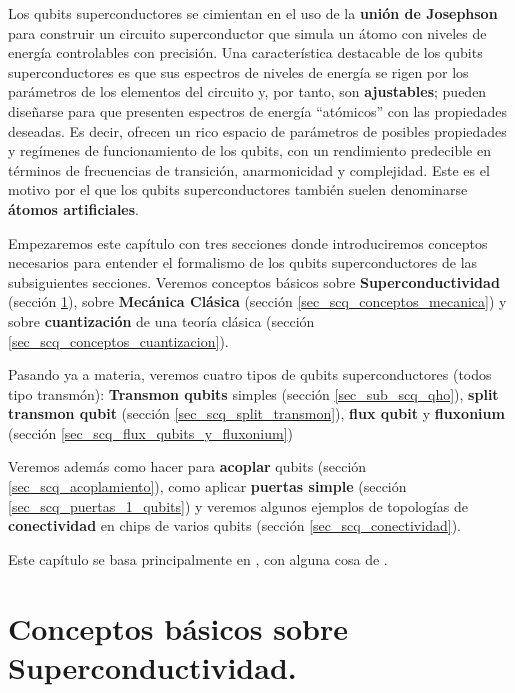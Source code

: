 Los qubits superconductores se cimientan en el uso de la \textbf{unión de Josephson} para construir un circuito superconductor que simula un átomo con niveles de energía controlables con precisión. Una característica destacable de los qubits superconductores es que sus espectros de niveles de energía se rigen por los parámetros de los elementos del circuito y, por tanto, son \textbf{ajustables}; pueden diseñarse para que presenten espectros de energía ``atómicos'' con las propiedades deseadas. Es decir, ofrecen un rico espacio de parámetros de posibles propiedades y regímenes de funcionamiento de los qubits, con un rendimiento predecible en términos de frecuencias de transición, anarmonicidad y complejidad. Este es el motivo por el que los qubits superconductores también suelen denominarse \textbf{átomos artificiales}.

Empezaremos este capítulo con tres secciones donde introduciremos conceptos necesarios para entender el formalismo de los qubits superconductores de las subsiguientes secciones. Veremos conceptos básicos sobre \textbf{Superconductividad} (sección \ref{sec_scq_conceptos_superconductividad}), sobre \textbf{Mecánica Clásica} (sección \ref{sec_scq_conceptos_mecanica}) y sobre \textbf{cuantización} de una teoría clásica (sección \ref{sec_scq_conceptos_cuantizacion}).

Pasando ya a materia, veremos cuatro tipos de qubits superconductores (todos tipo transmón): \textbf{Transmon qubits} simples (sección \ref{sec_sub_scq_qho}), \textbf{split transmon qubit} (sección \ref{sec_scq_split_transmon}), \textbf{flux qubit} y \textbf{fluxonium} (sección \ref{sec_scq_flux_qubits_y_fluxonium})

Veremos además como hacer para \textbf{acoplar} qubits (sección \ref{sec_scq_acoplamiento}), como aplicar \textbf{puertas simple} (sección \ref{sec_scq_puertas_1_qubits}) y veremos algunos ejemplos de topologías de \textbf{conectividad} en chips de varios qubits (sección \ref{sec_scq_conectividad}).

Este capítulo se basa principalmente en \cite{bib_A_quantum_engineers_guide}, con alguna cosa de \cite{bib_scq_ezratty2023perspective}.


\newpage
\section{Conceptos básicos sobre Superconductividad.} \label{sec_scq_conceptos_superconductividad}



